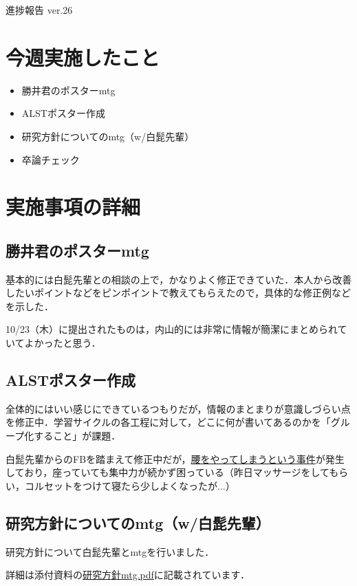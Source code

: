 \documentclass[a4paper,12pt]{ltjsarticle}
\begin{document}
\centerline{\huge 進捗報告 ver.26}


\section{今週実施したこと}
\begin{itemize}[label={--}]
  \item 勝井君のポスターmtg
  \item ALSTポスター作成
  \item 研究方針についてのmtg（w/白髭先輩）
  \item 卒論チェック
\end{itemize}
\clearpage

\section{実施事項の詳細}
\subsection{勝井君のポスターmtg}
基本的には白髭先輩との相談の上で，かなりよく修正できていた．本人から改善したいポイントなどをピンポイントで教えてもらえたので，具体的な修正例などを示した．

10/23（木）に提出されたものは，内山的には非常に情報が簡潔にまとめられていてよかったと思う．\\

\subsection{ALSTポスター作成}
全体的にはいい感じにできているつもりだが，情報のまとまりが意識しづらい点を修正中．学習サイクルの各工程に対して，どこに何が書いてあるのかを「グループ化すること」が課題．

白髭先輩からのFBを踏まえて修正中だが，\underline{腰をやってしまうという事件}が発生しており，座っていても集中力が続かず困っている（昨日マッサージをしてもらい，コルセットをつけて寝たら少しよくなったが...）\\

\subsection{研究方針についてのmtg（w/白髭先輩）}
研究方針について白髭先輩とmtgを行いました．

詳細は添付資料の\underline{研究方針mtg.pdf}に記載されています．\\
\end{document}
